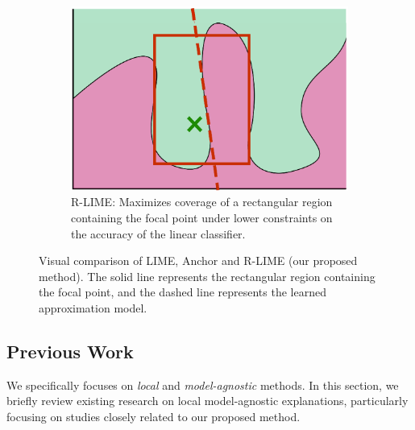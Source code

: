 \documentclass[runningheads]{llncs}
\begin{document}
\begin{figure}[tbp]
	\hspace{0.03\textwidth}
	\begin{subfigure}[t]{0.3\textwidth}
		\centering
		\includegraphics[width=\textwidth]{visual-rlime}
		\caption{%
			R-LIME:
			Maximizes coverage of a rectangular region containing the focal point
			under lower constraints on the accuracy of the linear classifier.
		}\label{fig:rlime}
	\end{subfigure}
	\caption{%
		Visual comparison of LIME, Anchor and R-LIME (our proposed method).
		The solid line represents the rectangular region containing the focal
		point, and the dashed line represents the learned approximation model.
	}
\end{figure}
\subsection{Previous Work}
We specifically focuses on \emph{local} and \emph{model-agnostic} methods.
In this section,
we briefly review existing research on local model-agnostic explanations,
particularly focusing on studies closely related to our proposed method.
\end{document}
